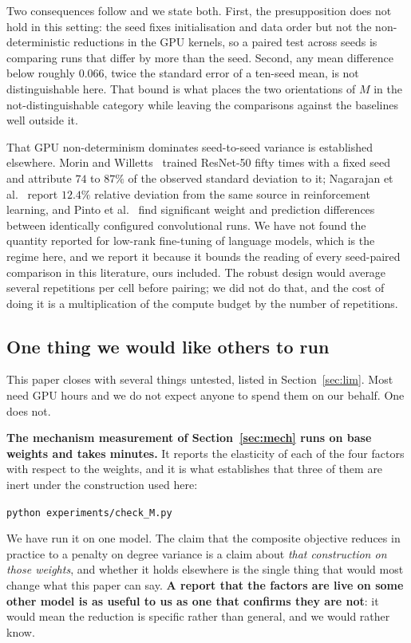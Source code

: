 \documentclass[11pt,a4paper]{article}
\begin{document}
Two consequences follow and we state both. First, the presupposition does not
hold in this setting: the seed fixes initialisation and data order but not the
non-deterministic reductions in the GPU kernels, so a paired test across seeds
is comparing runs that differ by more than the seed. Second, any mean difference
below roughly $0.066$, twice the standard error of a ten-seed mean, is not
distinguishable here. That bound is what places the two orientations of $M$ in
the not-distinguishable category while leaving the comparisons against the
baselines well outside it.

That GPU non-determinism dominates seed-to-seed variance is established
elsewhere. Morin and Willetts~\cite{morin2020} trained ResNet-50 fifty times
with a fixed seed and attribute $74$ to $87\%$ of the observed standard
deviation to it; Nagarajan et al.~\cite{nagarajan2018} report $12.4\%$ relative
deviation from the same source in reinforcement learning, and Pinto et
al.~\cite{pinto2021} find significant weight and prediction differences between
identically configured convolutional runs. We have not found the quantity
reported for low-rank fine-tuning of language models, which is the regime here,
and we report it because it bounds the reading of every seed-paired comparison
in this literature, ours included. The robust design would average several
repetitions per cell before pairing; we did not do that, and the cost of doing
it is a multiplication of the compute budget by the number of repetitions.

\subsection{One thing we would like others to run}
\label{sec:colab}

This paper closes with several things untested, listed in
Section~\ref{sec:lim}. Most need GPU hours and we do not expect anyone to spend
them on our behalf. One does not.

\textbf{The mechanism measurement of Section~\ref{sec:mech} runs on base weights
and takes minutes.} It reports the elasticity of each of the four factors with
respect to the weights, and it is what establishes that three of them are inert
under the construction used here:

\begin{center}
\texttt{python experiments/check\_M.py}
\end{center}

We have run it on one model. The claim that the composite objective reduces in
practice to a penalty on degree variance is a claim about \emph{that
construction on those weights}, and whether it holds elsewhere is the single
thing that would most change what this paper can say. \textbf{A report that the
factors are live on some other model is as useful to us as one that confirms
they are not}: it would mean the reduction is specific rather than general, and
we would rather know.
\end{document}
